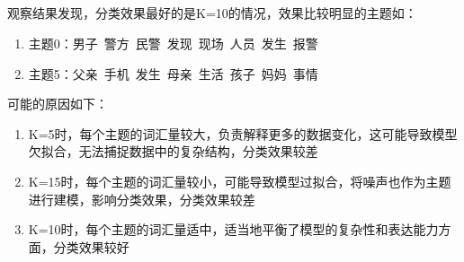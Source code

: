 \documentclass[12pt,a4paper]{article}
\begin{document}
\subsection{}
观察结果发现，分类效果最好的是K=10的情况，效果比较明显的主题如：
\begin{enumerate}
    \item 主题0：男子\ 警方\ 民警\ 发现\ 现场\ 人员\ 发生\ 报警
    \item 主题5：父亲\ 手机\ 发生\ 母亲\ 生活\ 孩子\ 妈妈\ 事情
\end{enumerate}
可能的原因如下：
\begin{enumerate}
    \item K=5时，每个主题的词汇量较大，负责解释更多的数据变化，这可能导致模型欠拟合，无法捕捉数据中的复杂结构，分类效果较差
    \item K=15时，每个主题的词汇量较小，可能导致模型过拟合，将噪声也作为主题进行建模，影响分类效果，分类效果较差
    \item K=10时，每个主题的词汇量适中，适当地平衡了模型的复杂性和表达能力方面，分类效果较好
\end{enumerate}
\end{document}
